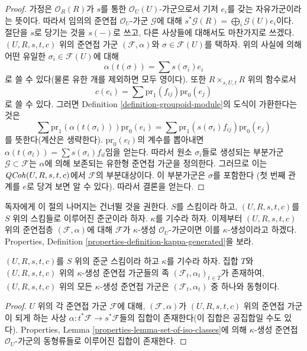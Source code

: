 \begin{proof}
가정은 $\mathcal{O}_R(R)$가 $s$를 통한 $\mathcal{O}_U(U)$-가군으로서 기저 $e_i$를 갖는 자유가군이라는 뜻이다.
따라서 임의의 준연접 $\mathcal{O}_U$-가군 $\mathcal{G}$에 대해
$s^*\mathcal{G}(R) = \bigoplus_i \mathcal{G}(U)e_i$이다. 절단을 $s$로 당기는 것을 $s(-)$로 쓰고,
다른 사상들에 대해서도 마찬가지로 쓰겠다.
$(U, R, s, t, c)$ 위의 준연접 가군 $(\mathcal{F}, \alpha)$와 $\sigma \in \mathcal{F}(U)$를 택하자.
위의 사실에 의해 어떤 유일한 $\sigma_i \in \mathcal{F}(U)$에 대해
$$
\alpha(t(\sigma)) = \sum s(\sigma_i) e_i
$$
로 쓸 수 있다(물론 유한 개를 제외하면 모두 영이다). 또한 $R \times_{s, U, t}R$ 위의 함수로서
$$
c(e_i) = \sum \text{pr}_1(f_{ij}) \text{pr}_0(e_j)
$$
로 쓸 수 있다. 그러면 Definition \ref{definition-groupoid-module}의 도식이 가환한다는 것은
$$
\sum \text{pr}_1(\alpha(t(\sigma_i))) \text{pr}_0(e_i)
=
\sum \text{pr}_1(s(\sigma_i)f_{ij}) \text{pr}_0(e_j)
$$
를 뜻한다(계산은 생략한다). $\text{pr}_0(e_l)$의 계수를 뽑아내면
$\alpha(t(\sigma_l)) = \sum s(\sigma_i)f_{il}$임을 얻는다. 따라서 원소 $\sigma_i$들로 생성되는 부분가군
$\mathcal{G} \subset \mathcal{F}$는 $\alpha$에 의해 보존되는 유한형 준연접 가군을 정의한다. 그러므로 이는
$\mathit{QCoh}(U, R, s, t, c)$에서 $\mathcal{F}$의 부분대상이다. 이 부분가군은 $\sigma$를 포함한다
(첫 번째 관계를 $e$로 당겨 보면 알 수 있다). 따라서 결론을 얻는다.
\end{proof}

\noindent
독자에게 이 절의 나머지는 건너뛸 것을 권한다. $S$를 스킴이라 하고, $(U, R, s, t, c)$를 $S$ 위의 스킴들로
이루어진 준군이라 하자. $\kappa$를 기수라 하자. 이제부터 $(U, R, s, t, c)$ 위의 준연접층
$(\mathcal{F}, \alpha)$에 대해 $\mathcal{F}$가 $\kappa$-생성 $\mathcal{O}_U$-가군이면 이를
$\kappa$-생성이라고 하겠다. Properties, Definition \ref{properties-definition-kappa-generated}을 보라.

\begin{lemma}
\label{lemma-set-of-iso-classes}
$(U, R, s, t, c)$를 $S$ 위의 준군 스킴이라 하고 $\kappa$를 기수라 하자. 집합 $T$와
$(U, R, s, t, c)$ 위의 $\kappa$-생성 준연접 가군들의 족 $(\mathcal{F}_t, \alpha_t)_{t \in T}$가 존재하여,
$(U, R, s, t, c)$ 위의 모든 $\kappa$-생성 준연접 가군은 $(\mathcal{F}_t, \alpha_t)$ 중 하나와 동형이다.
\end{lemma}

\begin{proof}
$U$ 위의 각 준연접 가군 $\mathcal{F}$에 대해, $(\mathcal{F}, \alpha)$가 $(U, R, s, t, c)$ 위의 준연접 가군이
되게 하는 사상 $\alpha : t^*\mathcal{F} \to s^*\mathcal{F}$들의 집합이 존재한다(이 집합은 공집합일 수도 있다).
Properties, Lemma \ref{properties-lemma-set-of-iso-classes}에 의해 $\kappa$-생성 준연접
$\mathcal{O}_U$-가군의 동형류들로 이루어진 집합이 존재한다.
\end{proof}

